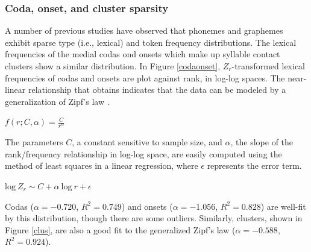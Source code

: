 

\subsubsection{Coda, onset, and cluster sparsity}

A number of previous studies \citep[e.g.,][]{Sigurd1968,Good1969,Borodovsky1989,Witten1990,Martindale1996,Tambovtsev2007} have observed that phonemes and graphemes exhibit sparse type (i.e., lexical) and token frequency distributions. The lexical frequencies of the medial codas ond onsets which make up syllable contact clusters show a similar distribution. In Figure \ref{codaonset}, $Z_r$-transformed lexical frequencies of codas and onsets are plot against rank, in log-log spaces. The near-linear relationship that obtains indicates that the data can be modeled by a generalization of Zipf's law \citep{Zipf1949}.


\begin{unlabeledexample}
$\displaystyle f(r; C, \alpha) = \frac{C}{r^\alpha}$ 
\end{unlabeledexample}

\noindent The parameters $C$, a constant sensitive to sample size, and $\alpha$, the slope of the rank/frequency relationship in log-log space, are easily computed using the method of least squares in a linear regression, where $\epsilon$ represents the error term.

\begin{example}[example]
$\displaystyle \textrm{log}~Z_r \sim C + \alpha~\textrm{log}~r + \epsilon$ 
\end{example}

\noindent Codas ($\alpha = -0.720$, $R^2 = 0.749$) and onsets ($\alpha = -1.056$, $R^2 = 0.828$) are well-fit by this distribution, though there are some outliers. Similarly, clusters, shown in Figure \ref{clus}, are also a good fit to the generalized Zipf's law ($\alpha = -0.588$, $R^2 = 0.924$). 

